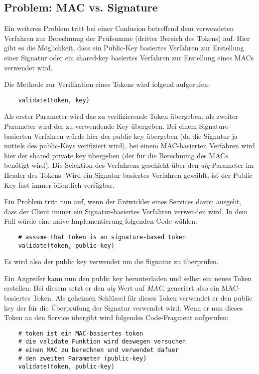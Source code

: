\subsection{Problem: MAC vs. Signature}

Ein weiteres Problem tritt bei einer Confusion betreffend dem verwendeten Verfahren zur Berechnung der Prüfsumme (dritter Bereich des Tokens) auf. Hier gibt es die Möglichkeit, dass ein Public-Key basiertes Verfahren zur Erstellung einer Signatur oder ein shared-key basiertes Verfahren zur Erstellung eines MACs verwendet wird.

Die Methode zur Verifikation eines Tokens wird folgend aufgerufen:

\begin{verbatim}
	validate(token, key)
\end{verbatim}

Als erster Parameter wird das zu verifizierende Token übergeben, als zweiter Parameter wird der zu verwendende Key übergeben. Bei einem Signature-basierten Verfahren würde hier der public-key übergeben (da die Signatur ja mittels des public-Keys verifiziert wird), bei einem MAC-basierten Verfahren wird hier der shared private key übergeben (der für die Berechnung des MACs benötigt wird). Die Selektion des Verfahrens geschieht über den \textit{alg} Parameter im Header des Tokens. Wird ein Signatur-basiertes Verfahren gewählt, ist der Public-Key fast immer öffentlich verfügbar.

Ein Problem tritt nun auf, wenn der Entwickler eines Services davon ausgeht, dass der Client immer ein Signatur-basiertes Verfahren verwenden wird. In dem Fall würde eine naive Implementierung folgenden Code wählen:

\begin{verbatim}
	# assume that token is an signature-based token
	validate(token, public-key)
\end{verbatim}

Es wird also der public key verwendet um die Signatur zu überprüfen.

Ein Angreifer kann nun den public key herunterladen und selbst ein neues Token erstellen. Bei diesem setzt er den \textit{alg} Wert auf \textit{MAC}, generiert also ein MAC-basiertes Token. Als geheimen Schlüssel für dieses Token verwendet er den public key der für die Überprüfung der Signatur verwendet wird. Wenn er nun dieses Token an den Service übergibt wird folgendes Code-Fragment aufgerufen:

\begin{verbatim}
	# token ist ein MAC-basiertes token
	# die validate Funktion wird deswegen versuchen
	# einen MAC zu berechnen und verwendet dafuer
	# den zweiten Parameter (public-key)
	validate(token, public-key)
\end{verbatim}

